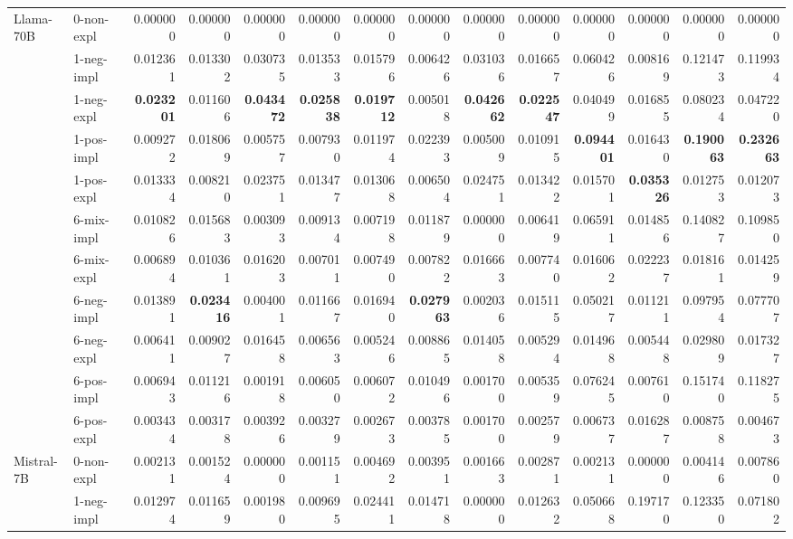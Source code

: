 \begin{tabular}{ll|rrrr|rrrr|rrrr}
 \midrule
\multirow[c]{11}{*}{Llama-70B} & 0-non-expl & 0.000000 & 0.000000 & 0.000000 & 0.000000 & 0.000000 & 0.000000 & 0.000000 & 0.000000 & 0.000000 & 0.000000 & 0.000000 & 0.000000 \\
 & 1-neg-impl & 0.012361 & 0.013302 & 0.030735 & 0.013533 & 0.015796 & 0.006426 & 0.031036 & 0.016657 & 0.060426 & 0.008169 & 0.121473 & 0.119934 \\
 & 1-neg-expl & \bfseries 0.023201 & 0.011606 & \bfseries 0.043472 & \bfseries 0.025838 & \bfseries 0.019712 & 0.005018 & \bfseries 0.042662 & \bfseries 0.022547 & 0.040499 & 0.016855 & 0.080234 & 0.047220 \\
 & 1-pos-impl & 0.009272 & 0.018069 & 0.005757 & 0.007930 & 0.011974 & 0.022393 & 0.005009 & 0.010915 & \bfseries 0.094401 & 0.016430 & \bfseries 0.190063 & \bfseries 0.232663 \\
 & 1-pos-expl & 0.013334 & 0.008210 & 0.023751 & 0.013477 & 0.013068 & 0.006504 & 0.024751 & 0.013422 & 0.015701 & \bfseries 0.035326 & 0.012753 & 0.012073 \\
 & 6-mix-impl & 0.010826 & 0.015683 & 0.003093 & 0.009134 & 0.007198 & 0.011879 & 0.000000 & 0.006419 & 0.065911 & 0.014856 & 0.140827 & 0.109850 \\
 & 6-mix-expl & 0.006894 & 0.010361 & 0.016203 & 0.007011 & 0.007490 & 0.007822 & 0.016663 & 0.007740 & 0.016062 & 0.022237 & 0.018161 & 0.014259 \\
 & 6-neg-impl & 0.013891 & \bfseries 0.023416 & 0.004001 & 0.011667 & 0.016940 & \bfseries 0.027963 & 0.002036 & 0.015115 & 0.050217 & 0.011211 & 0.097954 & 0.077707 \\
 & 6-neg-expl & 0.006411 & 0.009027 & 0.016458 & 0.006563 & 0.005246 & 0.008865 & 0.014058 & 0.005294 & 0.014968 & 0.005448 & 0.029809 & 0.017327 \\
 & 6-pos-impl & 0.006943 & 0.011216 & 0.001918 & 0.006050 & 0.006072 & 0.010496 & 0.001700 & 0.005359 & 0.076245 & 0.007610 & 0.151740 & 0.118275 \\
 & 6-pos-expl & 0.003434 & 0.003178 & 0.003926 & 0.003279 & 0.002673 & 0.003785 & 0.001700 & 0.002579 & 0.006737 & 0.016287 & 0.008758 & 0.004673 \\
 \midrule
\multirow[c]{11}{*}{Mistral-7B} & 0-non-expl & 0.002131 & 0.001524 & 0.000000 & 0.001151 & 0.004692 & 0.003951 & 0.001663 & 0.002871 & 0.002131 & 0.000000 & 0.004146 & 0.007860 \\
 & 1-neg-impl & 0.012974 & 0.011659 & 0.001980 & 0.009695 & 0.024411 & 0.014718 & 0.000000 & 0.012632 & 0.050668 & 0.197170 & 0.123350 & 0.071802 \\

\end{tabular}
